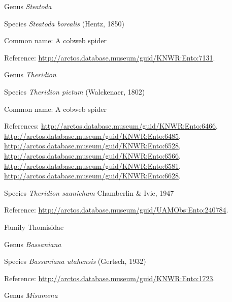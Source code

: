 \documentclass[9pt, article]{memoir}
\begin{document}
\begin{multicols}{2}
\vspace{6pt}\noindent\hspace{30pt}Genus \textit{Steatoda}


\vspace{6pt}\noindent\hspace{36pt}Species \textit{Steatoda borealis} (Hentz, 1850)


Common name: A cobweb spider

Reference: 
\url{http://arctos.database.museum/guid/KNWR:Ento:7131}.

\vspace{6pt}\noindent\hspace{30pt}Genus \textit{Theridion}


\vspace{6pt}\noindent\hspace{36pt}Species \textit{Theridion pictum} (Walckenaer, 1802)


Common name: A cobweb spider

References: 
\url{http://arctos.database.museum/guid/KNWR:Ento:6466}, 
\url{http://arctos.database.museum/guid/KNWR:Ento:6485}, 
\url{http://arctos.database.museum/guid/KNWR:Ento:6528}, 
\url{http://arctos.database.museum/guid/KNWR:Ento:6566}, 
\url{http://arctos.database.museum/guid/KNWR:Ento:6581}, 
\url{http://arctos.database.museum/guid/KNWR:Ento:6628}.

\vspace{6pt}\noindent\hspace{36pt}Species \textit{Theridion saanichum} Chamberlin \& Ivie, 1947


Reference: 
\url{http://arctos.database.museum/guid/UAMObs:Ento:240784}.

\vspace{6pt}\noindent\hspace{24pt}Family Thomisidae


\vspace{6pt}\noindent\hspace{30pt}Genus \textit{Bassaniana}


\vspace{6pt}\noindent\hspace{36pt}Species \textit{Bassaniana utahensis} (Gertsch, 1932)


Reference: 
\url{http://arctos.database.museum/guid/KNWR:Ento:1723}.

\vspace{6pt}\noindent\hspace{30pt}Genus \textit{Misumena}



\end{multicols}
\end{document}
